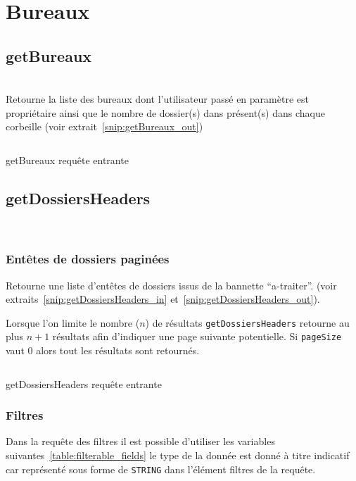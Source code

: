 \section{Bureaux}

\subsection{getBureaux}
\\

Retourne la liste des bureaux dont l'utilisateur passé en paramètre est propriétaire ainsi que le nombre de dossier(s) dans présent(s) dans chaque corbeille (voir extrait~\ref{snip:getBureaux_out}) 

\begin{codesnippet}
\inputminted[frame=single,linenos,fontsize=\footnotesize]{javascript}{extraits/getBureaux_in.js}
\caption{getBureaux requête entrante}
\label{snip:getBureaux_in}
\end{codesnippet}

\subsection{getDossiersHeaders}
\\

\subsubsection{Entêtes de dossiers paginées}

Retourne une liste d'entêtes de dossiers issus de la bannette ``a-traiter''. (voir extraits~\ref{snip:getDossiersHeaders_in} et~\ref{snip:getDossiersHeaders_out}).

Lorsque l'on limite le nombre ($n$) de résultats \verb|getDossiersHeaders| retourne au plus $n + 1$ résultats afin d'indiquer une page suivante potentielle. Si \verb|pageSize| vaut 0 alors tout les résultats sont retournés.

\begin{codesnippet}
\inputminted[frame=single,linenos,fontsize=\footnotesize]{javascript}{extraits/getDossiersHeaders_in.js}
\caption{getDossiersHeaders requête entrante}
\label{snip:getDossiersHeaders_in}
\end{codesnippet}

\subsubsection{Filtres}
Dans la requête des filtres il est possible d'utiliser les variables suivantes~\ref{table:filterable_fields} le type de la donnée est donné à titre indicatif car représenté sous forme de \verb|STRING| dans l'élément filtres de la requête.


